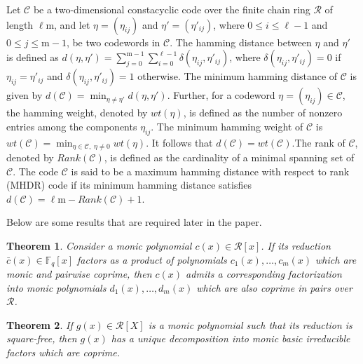 \documentclass[12pt,a4paper]{article}
\newtheorem{theorem}{Theorem}[section]
\begin{document}
\medskip
Let $\mathcal{C}$ be a two-dimensional constacyclic code over the finite chain ring $\mathcal{R}$ of length $\ell \mathrm{m}$, and let $\eta = (\eta_{ij})$ and $\eta' = (\eta'_{ij})$, where $0 \le i \le \ell - 1$ and $0 \le j \le \mathrm{m} - 1$, be two codewords in $\mathcal{C}$. The hamming distance between $\eta$ and $\eta'$ is defined as $d(\eta,\eta') = \sum_{j=0}^{\mathrm{m} - 1} \sum_{i=0}^{\ell - 1} \delta(\eta_{ij},\eta'_{ij})$, where $\delta(\eta_{ij},\eta'_{ij}) = 0$ if $\eta_{ij} = \eta'_{ij}$ and $\delta(\eta_{ij},\eta'_{ij}) = 1$ otherwise. The minimum hamming distance of $\mathcal{C}$ is given by $d(\mathcal{C}) = \min_{\eta \ne \eta'} d(\eta,\eta')$. Further, for a codeword $\eta = (\eta_{ij}) \in \mathcal{C}$, the hamming weight, denoted by $wt(\eta)$, is defined as the number of nonzero entries among the components $\eta_{ij}$. The minimum hamming weight of $\mathcal{C}$ is $wt(\mathcal{C}) = \min_{\eta \in \mathcal{C},\; \eta \ne 0} wt(\eta)$. It follows that $d(\mathcal{C}) = wt(\mathcal{C})$.The rank of $\mathcal{C}$, denoted by $Rank(\mathcal{C})$, is defined as the cardinality of a minimal spanning set of $\mathcal{C}$. The code $\mathcal{C}$ is said to be a maximum hamming distance with respect to rank (MHDR) code if its minimum hamming distance satisfies $d(\mathcal{C}) = \ell \mathrm{m} - Rank(\mathcal{C}) + 1$.

Below are some results that are required later in the paper.

\begin{theorem}\label{thm:first}
\cite{norton2000structure}   Consider a monic polynomial $c(x) \in \mathcal{R}[x]$. If its reduction $\bar{c}(x) \in \mathbb{F}_q[x]$ factors as a product of polynomials $c_1(x),\ldots,c_m(x)$ which are monic and pairwise coprime, then $c(x)$ admits a corresponding factorization into monic polynomials $d_1(x),\ldots,d_m(x)$ which are also coprime in pairs over $\mathcal{R}$.
\end{theorem}

\begin{theorem}\label{thm:second}
\cite{norton2000structure}    If $g(x) \in \mathcal{R}[X]$ is a monic polynomial such that its reduction is square-free, then $g(x)$ has a unique decomposition into monic basic irreducible factors which are coprime.
\end{theorem}
\end{document}
